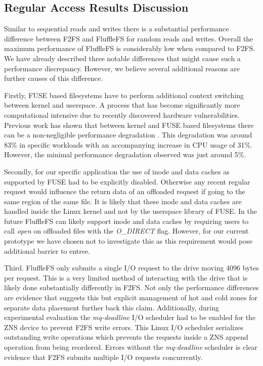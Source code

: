 \subsection{Regular Access Results Discussion}

Similar to sequential reads and writes there is a substantial performance
difference between F2FS and FluffleFS for random reads and writes. Overall the
maximum performance of FluffleFS is considerably low when compared to F2FS. We
have already described three notable differences that might cause such a
performance discrepancy. However, we believe several additional reasons are
further causes of this difference.

Firstly, FUSE based filesystems have to perform additional context switching
between kernel and userspace. A process that has become significantly more
computational intensive due to recently discovered hardware vulnerabilities.
Previous work has shown that between kernel and FUSE based filesystems there can
be a non-negligible performance degradation \cite{Vangoor2017ToFO}. This
degradation was around 83\% in specific workloads with an accompanying increase
in CPU usage of 31\%. However, the minimal performance degradation observed was
just around 5\%.

Secondly, for our specific application the use of inode and data caches as
supported by FUSE had to be explicitly disabled. Otherwise any recent regular
request would influence the return data of an offloaded request if going to the
same region of the same file. It is likely that these inode and data caches are
handled inside the Linux kernel and not by the userspace library of FUSE. 
In the future FluffleFS can likely support inode and data caches by requiring
users to call \textit{open} on offloaded files with the \textit{O\_DIRECT}
flag. However, for our current prototype we have chosen not to investigate this
as this requirement would pose additional barrier to entree.

Third. FluffleFS only submits a single I/O request to the drive moving 4096
bytes per request. This is a very limited method of interacting with the drive
that is likely done substantially differently in F2FS. Not only the performance
differences are evidence that suggests this but explicit management of hot
and cold zones for separate data placement further back this claim.
Additionally, during experimental evaluation the \textit{mq-deadline} I/O
scheduler had to be enabled for the ZNS device to prevent F2FS write errors.
This Linux I/O scheduler serializes outstanding write operations which prevents
the requests inside a ZNS append operation from being reordered. Errors
without the \textit{mq-deadline} scheduler is clear evidence that F2FS submits
multiple I/O requests concurrently.

